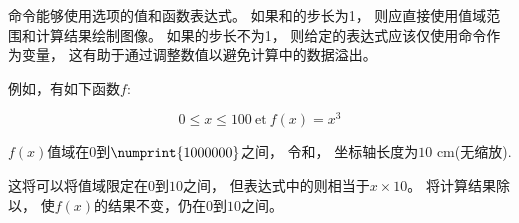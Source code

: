 \documentclass[../main.tex]{subfiles}
\begin{document}
命令能够使用选项的值和函数表达式。
如果和的步长为1，
则应直接使用值域范围和计算结果绘制图像。
如果的步长不为1，
则给定的表达式应该仅使用命令作为变量，
这有助于通过调整数值以避免计算中的数据溢出。

例如，有如下函数$f$:

\[
 0\leq x\leq 100 \ \text{et}\ f(x)=x^3
\]

$f(x)$值域在$0$到$\numprint{1000000}$之间，
令和，
坐标轴长度为$10$ cm(无缩放).

这将可以将值域限定在$0$到$10$之间，
但表达式中的则相当于$x \times 10$。
将计算结果除以，
使$f(x)$的结果不变，仍在$0$到$10$之间。

 \begin{tkzexample}[latex=10cm,small]
\end{tkzexample}
\end{document}
